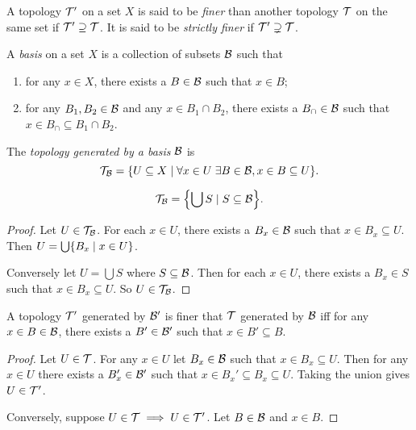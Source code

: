 \begin{definition}[Refinement] \label{def:refinement}
    A topology $\mathcal{T}'$ on a set $X$ is said to be \emph{finer} than
    another topology $\mathcal{T}$ on the same set if $\mathcal{T}' \supseteq \mathcal{T}$.
    It is said to be \emph{strictly finer} if $\mathcal{T}' \supsetneq \mathcal{T}$.
\end{definition}

\begin{definition*}[Basis] \label{def:basis}
    A \emph{basis} on a set $X$ is a collection
    of subsets $\mathcal{B}$ such that
    \begin{enumerate}[label=\small(B\arabic*)]
        \item for any $x \in X$, there exists a $B \in \mathcal{B}$
            such that $x \in B$;
        \item for any $B_1, B_2 \in \mathcal{B}$ and any $x \in B_1 \cap B_2$,
            there exists a $B_\cap \in \mathcal{B}$ such that
            $x \in B_\cap \subseteq B_1 \cap B_2$.
    \end{enumerate}
\end{definition*}

\begin{definition*}
    The \emph{topology generated by a basis} $\mathcal{B}$ is \[
        \mathcal{T}_{\mathcal{B}} = \{U \subseteq X \mid
            \forall x \in U\; \exists B \in \mathcal{B}, x \in B \subseteq U\}.
    \]
\end{definition*}
\begin{corollary}
    \[
        \T_\mcB = \set*{\bigcup S \mid S \subseteq \mcB}.
    \]
\end{corollary}
\begin{proof}
    Let $U \in \mathcal{T}_{\mathcal{B}}$.
    For each $x \in U$, there exists a $B_x \in \mathcal{B}$ such that
    $x \in B_x \subseteq U$.
    Then $U = \bigcup \{B_x \mid x \in U\}$.

    Conversely let $U = \bigcup S$ where $S \subseteq \mathcal{B}$.
    Then for each $x \in U$, there exists a $B_x \in S$ such that
    $x \in B_x \subseteq U$.
    So $U \in \mathcal{T}_{\mathcal{B}}$.
\end{proof}

\begin{proposition} \label{thm:finer-basis}
    A topology $\mathcal{T}'$ generated by $\mathcal{B}'$ is finer that
    $\mathcal{T}$ generated by $\mathcal{B}$ iff
    for any $x \in B \in \mathcal{B}$, there exists a $B' \in \mathcal{B}'$ such that
    $x \in B' \subseteq B$.
\end{proposition}
\begin{proof}
    Let $U \in \mathcal{T}$.
    For any $x \in U$ let $B_x \in \mathcal{B}$ such that $x \in B_x \subseteq U$.
    Then for any $x \in U$ there exists a $B_x' \in \mathcal{B}'$ such that
    $x \in B_x' \subseteq B_x \subseteq U$.
    Taking the union gives $U \in \mathcal{T}'$.

    Conversely, suppose $U \in \mathcal{T} \implies U \in \mathcal{T}'$.
    Let $B \in \mathcal{B}$ and $x \in B$.
\end{proof}
